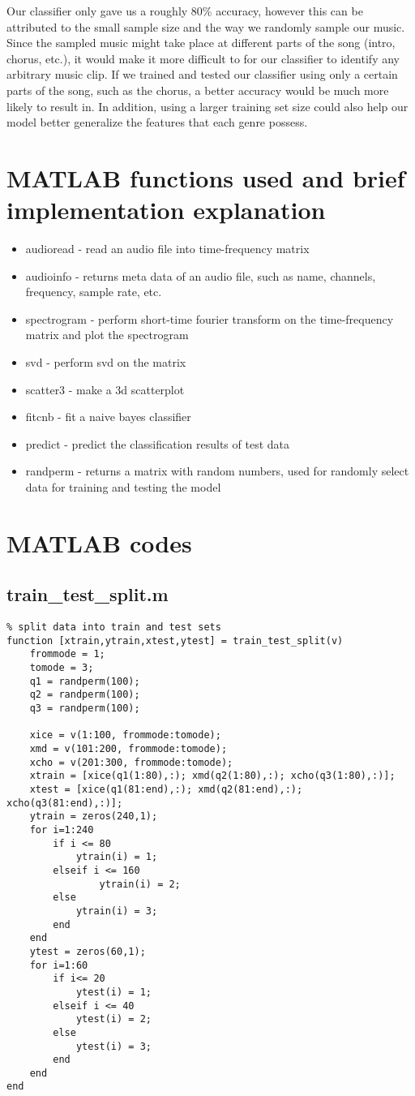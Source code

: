 \documentclass[12pt, a4paper]{article}
\begin{document}
Our classifier only gave us a roughly 80\% accuracy, however this can be attributed to the small sample size and the way we randomly sample our music. Since the sampled music might take place at different parts of the song (intro, chorus, etc.), it would make it more difficult to for our classifier to identify any arbitrary music clip. If we trained and tested our classifier using only a certain parts of the song, such as the chorus, a better accuracy would be much more likely to result in. In addition, using a larger training set size could also help our model better generalize the features that each genre possess.
\newpage
\appendix
\section{MATLAB functions used and brief implementation explanation}
\begin{itemize}
\item audioread - read an audio file into time-frequency matrix
\item audioinfo - returns meta data of an audio file, such as name, channels, frequency, sample rate, etc.
\item spectrogram - perform short-time fourier transform on the time-frequency matrix and plot the spectrogram
\item svd - perform svd on the matrix
\item scatter3 - make a 3d scatterplot
\item fitcnb - fit a naive bayes classifier
\item predict - predict the classification results of test data
\item randperm - returns a matrix with random numbers, used for randomly select data for training and testing the model
\end{itemize}

\section{MATLAB codes}
\subsection{train\_test\_split.m}
\begin{verbatim}
% split data into train and test sets
function [xtrain,ytrain,xtest,ytest] = train_test_split(v)
    frommode = 1;
    tomode = 3;
    q1 = randperm(100);
    q2 = randperm(100);
    q3 = randperm(100);

    xice = v(1:100, frommode:tomode);
    xmd = v(101:200, frommode:tomode);
    xcho = v(201:300, frommode:tomode);
    xtrain = [xice(q1(1:80),:); xmd(q2(1:80),:); xcho(q3(1:80),:)];
    xtest = [xice(q1(81:end),:); xmd(q2(81:end),:); xcho(q3(81:end),:)];
    ytrain = zeros(240,1);
    for i=1:240
        if i <= 80
            ytrain(i) = 1;
        elseif i <= 160
                ytrain(i) = 2;
        else
            ytrain(i) = 3;
        end
    end
    ytest = zeros(60,1);
    for i=1:60
        if i<= 20
            ytest(i) = 1;
        elseif i <= 40
            ytest(i) = 2;
        else
            ytest(i) = 3;
        end
    end
end
\end{verbatim}
\end{document}
